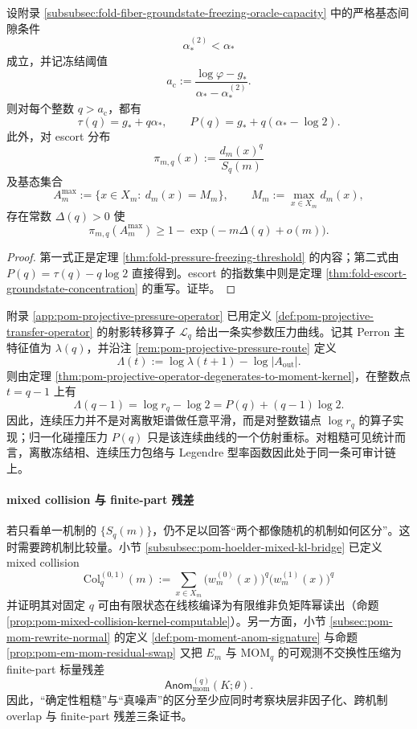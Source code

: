 \begin{theorem}\label{thm:frt-apparent-randomness-freezing-escort}
设附录 \ref{subsubsec:fold-fiber-groundstate-freezing-oracle-capacity} 中的严格基态间隙条件
\[
\alpha_*^{(2)}<\alpha_*
\]
成立，并记冻结阈值
\[
a_{\mathrm c}:=\frac{\log\varphi-g_*}{\alpha_*-\alpha_*^{(2)}}.
\]
则对每个整数 \(q>a_{\mathrm c}\)，都有
\[
\tau(q)=g_*+q\alpha_*,
\qquad
P(q)=g_*+q(\alpha_*-\log 2).
\]
此外，对 escort 分布
\[
\pi_{m,q}(x):=\frac{d_m(x)^q}{S_q(m)}
\]
及基态集合
\[
A_m^{\max}:=\{x\in X_m:\ d_m(x)=M_m\},
\qquad
M_m:=\max_{x\in X_m}d_m(x),
\]
存在常数 \(\Delta(q)>0\) 使
\[
\pi_{m,q}(A_m^{\max})
\ge
1-\exp\bigl(-m\Delta(q)+o(m)\bigr).
\]
\end{theorem}
\begin{proof}
第一式正是定理 \ref{thm:fold-pressure-freezing-threshold} 的内容；第二式由 \(P(q)=\tau(q)-q\log 2\) 直接得到。escort 的指数集中则是定理 \ref{thm:fold-escort-groundstate-concentration} 的重写。证毕。
\end{proof}

\begin{remark}[连续射影压力不是事后插值]\label{rem:frt-apparent-randomness-projective-pressure}
附录 \ref{app:pom-projective-pressure-operator} 已用定义 \ref{def:pom-projective-transfer-operator} 的射影转移算子 \(\mathcal L_q\) 给出一条实参数压力曲线。记其 Perron 主特征值为 \(\lambda(q)\)，并沿注 \ref{rem:pom-projective-pressure-route} 定义
\[
\Lambda(t):=\log \lambda(t+1)-\log |A_{\mathrm{out}}|.
\]
则由定理 \ref{thm:pom-projective-operator-degenerates-to-moment-kernel}，在整数点 \(t=q-1\) 上有
\[
\Lambda(q-1)=\log r_q-\log 2=P(q)+(q-1)\log 2.
\]
因此，连续压力并不是对离散矩谱做任意平滑，而是对整数锚点 \(\log r_q\) 的算子实现；归一化碰撞压力 \(P(q)\) 只是该连续曲线的一个仿射重标。对粗糙可见统计而言，离散冻结相、连续压力包络与 Legendre 型率函数因此处于同一条可审计链上。
\end{remark}

\paragraph{mixed collision 与 finite-part 残差}
若只看单一机制的 \(\{S_q(m)\}\)，仍不足以回答“两个都像随机的机制如何区分”。这时需要跨机制比较量。小节 \ref{subsubsec:pom-hoelder-mixed-kl-bridge} 已定义 mixed collision
\[
\mathrm{Col}^{(0,1)}_q(m)
:=
\sum_{x\in X_m}
\bigl(w_m^{(0)}(x)\bigr)^q
\bigl(w_m^{(1)}(x)\bigr)^q
\]
并证明其对固定 \(q\) 可由有限状态在线核编译为有限维非负矩阵幂读出（命题 \ref{prop:pom-mixed-collision-kernel-computable}）。另一方面，小节 \ref{subsec:pom-mom-rewrite-normal} 的定义 \ref{def:pom-moment-anom-signature} 与命题 \ref{prop:pom-em-mom-residual-swap} 又把 \(E_m\) 与 \(\mathrm{MOM}_q\) 的可观测不交换性压缩为 finite-part 标量残差
\[
\mathsf{Anom}^{(q)}_{\mathrm{mom}}(K;\theta).
\]
因此，“确定性粗糙”与“真噪声”的区分至少应同时考察块层非因子化、跨机制 overlap 与 finite-part 残差三条证书。


